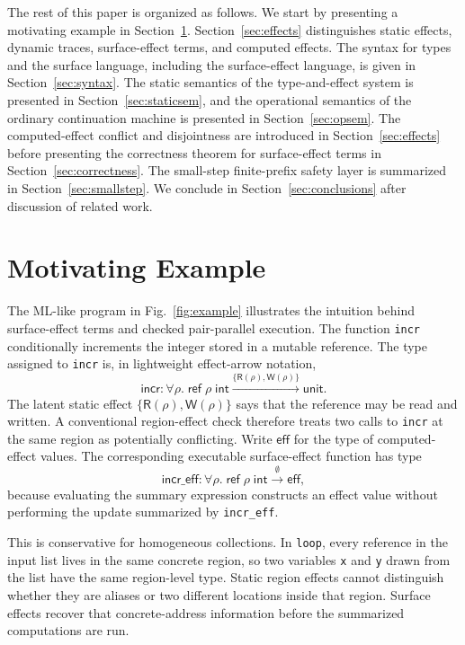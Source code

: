 \documentclass[10pt,a4paper]{article}
\newcommand{\Rs}{\mathsf{R}}
\newcommand{\Ws}{\mathsf{W}}
\begin{document}
The rest of this paper is organized as follows. We start by presenting a
motivating example in Section~\ref{sec:motivating}.
Section~\ref{sec:effects} distinguishes static effects, dynamic traces,
surface-effect terms, and computed effects. The syntax for types and the
surface language, including the surface-effect language, is given in
Section~\ref{sec:syntax}. The static semantics of the type-and-effect system is
presented in Section~\ref{sec:staticsem}, and the operational semantics of the
ordinary continuation machine is presented in Section~\ref{sec:opsem}. The
computed-effect conflict and disjointness are introduced in Section~\ref{sec:effects}
before presenting the correctness theorem for surface-effect terms in
Section~\ref{sec:correctness}. The small-step finite-prefix safety layer is
summarized in Section~\ref{sec:smallstep}. We conclude in
Section~\ref{sec:conclusions} after discussion of related work.
\section{Motivating Example}
\label{sec:motivating}

The ML-like program in Fig.~\ref{fig:example} illustrates the intuition behind
surface-effect terms and checked pair-parallel execution. The function
\lstinline|incr| conditionally increments the integer stored in a mutable
reference. The type assigned to \lstinline|incr| is, in lightweight
effect-arrow notation,
\[
  \mathsf{incr} :
  \forall\rho.\;
  \mathsf{ref}\;\rho\;\mathsf{int}
  \xrightarrow{\{\Rs(\rho),\Ws(\rho)\}}
  \mathsf{unit}.
\]
The latent static effect $\{\Rs(\rho),\Ws(\rho)\}$ says that the reference may
be read and written. A conventional region-effect check therefore treats two
calls to \lstinline|incr| at the same region as potentially conflicting. Write
$\mathsf{eff}$ for the type of computed-effect values. The corresponding
executable surface-effect function has type
\[
  \mathsf{incr\_eff} :
  \forall\rho.\;
  \mathsf{ref}\;\rho\;\mathsf{int}
  \xrightarrow{\emptyset}
  \mathsf{eff},
\]
because evaluating the summary expression constructs an effect value without
performing the update summarized by \lstinline|incr_eff|.

This is conservative for homogeneous collections. In \lstinline|loop|, every
reference in the input list lives in the same concrete region, so two variables
\lstinline|x| and \lstinline|y| drawn from the list have the same region-level
type. Static region effects cannot distinguish whether they are aliases or two
different locations inside that region. Surface effects recover that
concrete-address information before the summarized computations are run.
\end{document}

